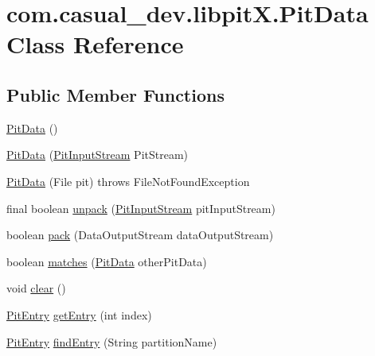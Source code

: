 \hypertarget{classcom_1_1casual__dev_1_1libpit_x_1_1_pit_data}{\section{com.\-casual\-\_\-dev.\-libpit\-X.\-Pit\-Data Class Reference}
\label{classcom_1_1casual__dev_1_1libpit_x_1_1_pit_data}
}
\subsection*{Public Member Functions}
\begin{DoxyCompactItemize}
\item 
\hyperlink{classcom_1_1casual__dev_1_1libpit_x_1_1_pit_data_a72404a581db05242899de5b20829397f}{Pit\-Data} ()
\item 
\hyperlink{classcom_1_1casual__dev_1_1libpit_x_1_1_pit_data_ad59e327e63bd5124602a568c07b03c83}{Pit\-Data} (\hyperlink{classcom_1_1casual__dev_1_1libpit_x_1_1_pit_input_stream}{Pit\-Input\-Stream} Pit\-Stream)
\item 
\hyperlink{classcom_1_1casual__dev_1_1libpit_x_1_1_pit_data_a14b344a02bf51eda6249aed851ee60e3}{Pit\-Data} (File pit)  throws File\-Not\-Found\-Exception 
\item 
final boolean \hyperlink{classcom_1_1casual__dev_1_1libpit_x_1_1_pit_data_a9bd057201d931c4c013112bc9fc001cd}{unpack} (\hyperlink{classcom_1_1casual__dev_1_1libpit_x_1_1_pit_input_stream}{Pit\-Input\-Stream} pit\-Input\-Stream)
\item 
boolean \hyperlink{classcom_1_1casual__dev_1_1libpit_x_1_1_pit_data_a2226a51b2f752fc5e5f7f9fa49000f2e}{pack} (Data\-Output\-Stream data\-Output\-Stream)
\item 
boolean \hyperlink{classcom_1_1casual__dev_1_1libpit_x_1_1_pit_data_a2ad3b955bde05da162be4447058c7d5e}{matches} (\hyperlink{classcom_1_1casual__dev_1_1libpit_x_1_1_pit_data}{Pit\-Data} other\-Pit\-Data)
\item 
void \hyperlink{classcom_1_1casual__dev_1_1libpit_x_1_1_pit_data_a9a809b7293bbdc825730d88f7e862696}{clear} ()
\item 
\hyperlink{classcom_1_1casual__dev_1_1libpit_x_1_1_pit_entry}{Pit\-Entry} \hyperlink{classcom_1_1casual__dev_1_1libpit_x_1_1_pit_data_a8026048cec0b3d1a82b4f5eeff544b8f}{get\-Entry} (int index)
\item 
\hyperlink{classcom_1_1casual__dev_1_1libpit_x_1_1_pit_entry}{Pit\-Entry} \hyperlink{classcom_1_1casual__dev_1_1libpit_x_1_1_pit_data_ad217cc1f0d88f0bd99d0a8145d977e01}{find\-Entry} (String partition\-Name)

\end{DoxyCompactItemize}
